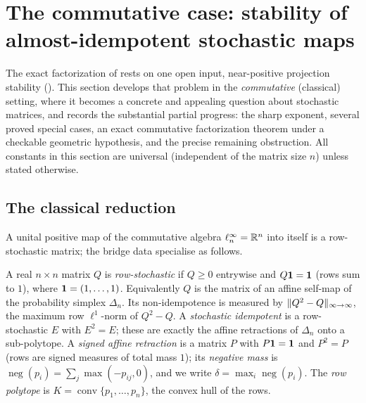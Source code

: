 \section{The commutative case: stability of almost-idempotent stochastic maps}
\label{sec:classical}

The exact factorization of  rests on one open input,
near-positive projection stability (). This section develops that
problem in the \emph{commutative} (classical) setting, where it becomes a
concrete and appealing question about stochastic matrices, and records the
substantial partial progress: the sharp exponent, several proved special cases,
an exact commutative factorization theorem under a checkable geometric
hypothesis, and the precise remaining obstruction. All constants in this section
are universal (independent of the matrix size $n$) unless stated otherwise.

\subsection{The classical reduction}

A unital positive map of the commutative algebra $\ell^{\infty}_n=\mathbb{R}^n$ into
itself is a row-stochastic matrix; the bridge data specialise as follows.

\begin{definition}\label{def:stochastic}
A real $n\times n$ matrix $Q$ is \emph{row-stochastic} if $Q\ge0$ entrywise and
$Q\mathbf{1}=\mathbf{1}$ (rows sum to $1$), where $\mathbf{1}=(1,\dots,1)$. Equivalently $Q$ is the
matrix of an affine self-map of the probability simplex $\Delta_n$. Its
non-idempotence is measured by $\lVert Q^2-Q \rVert_{\infty\to\infty}$, the maximum
row $\ell^1$-norm of $Q^2-Q$. A \emph{stochastic idempotent} is a row-stochastic
$E$ with $E^2=E$; these are exactly the affine retractions of $\Delta_n$ onto a
sub-polytope. A \emph{signed affine retraction} is a matrix $P$ with $P\mathbf{1}=\mathbf{1}$
and $P^2=P$ (rows are signed measures of total mass $1$); its
\emph{negative mass} is $\operatorname{neg}(p_i)=\sum_j\max(-p_{ij},0)$, and we
write $\delta=\max_i\operatorname{neg}(p_i)$. The \emph{row polytope} is
$K=\operatorname{conv}\{p_1,\dots,p_n\}$, the convex hull of the rows.
\end{definition}

